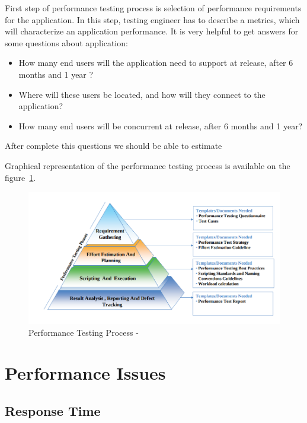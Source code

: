 First step of performance testing process is selection of performance requirements for the application. In this step, testing engineer has to describe a metrics, which will characterize an application performance. It is very helpful to get answers for some questions about application:

\begin{itemize}
	\setlength\itemsep{0em}
	\item How many end users will the application need to support at release, after 6 months and 1 year ?
	\item Where will these users be located, and how will they connect to the application?
	\item How many end users will be concurrent at release, after 6 months and 1 year?
\end{itemize}

After complete this questions we should be able to estimate 


Graphical representation of the performance testing process is available on the figure~\ref{fig:performace_testing_process}. 

\begin{figure}[H]
  \centering
  \includegraphics[width=13cm]{obrazky-figures/performance_process_pyramid.png}
  \caption{Performance Testing Process - }
  \label{fig:performace_testing_process}
\end{figure}

\section{Performance Issues}
\label{Performance Issues}

\subsection{Response Time}


